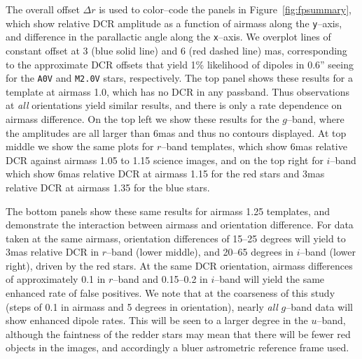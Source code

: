 \documentclass[DM,toc]{lsstdoc}
\begin{document}
The overall offset $\Delta r$ is used to color--code the panels in
Figure~\ref{fig:fpsummary}, which show relative DCR amplitude as a
function of airmass along the {\tt y}--axis, and difference in the
parallactic angle along the {\tt x}--axis.  We overplot lines of
constant offset at 3 (blue solid line) and 6 (red dashed line) mas,
corresponding to the approximate DCR offsets that yield 1\% likelihood
of dipoles in 0.6'' seeing for the {\tt A0V} and {\tt M2.0V} stars,
respectively.  The top panel shows these results for a template at
airmass 1.0, which has no DCR in any passband.  Thus observations at
{\it all} orientations yield similar results, and there is only a rate
dependence on airmass difference.  On the top left we show these
results for the $g$--band, where the amplitudes are all larger than
6mas and thus no contours displayed.  At top middle we show the same
plots for $r$--band templates, which show 6mas relative DCR against
airmass 1.05 to 1.15 science images, and on the top right for
$i$--band which show 6mas relative DCR at airmass 1.15 for the red
stars and 3mas relative DCR at airmass 1.35 for the blue stars.

The bottom panels show these same results for airmass 1.25 templates,
and demonstrate the interaction between airmass and orientation
difference.  For data taken at the same airmass, orientation
differences of 15--25 degrees will yield to 3mas relative DCR in
$r$--band (lower middle), and 20--65 degrees in $i$--band (lower
right), driven by the red stars.  At the same DCR orientation, airmass
differences of approximately 0.1 in $r$--band and 0.15--0.2 in
$i$--band will yield the same enhanced rate of false positives.  We
note that at the coarseness of this study (steps of 0.1 in airmass and
5 degrees in orientation), nearly {\it all} $g$--band data will show
enhanced dipole rates.  This will be seen to a larger degree in the
$u$--band, although the faintness of the redder stars may mean that
there will be fewer red objects in the images, and accordingly a bluer
astrometric reference frame used.
\end{document}
